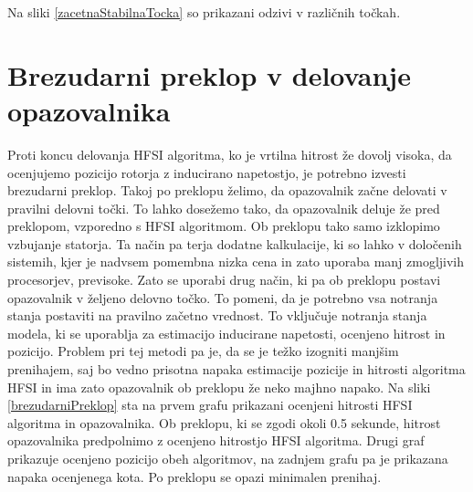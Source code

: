 \documentclass[a4paper,twoside,openright,12pt,slovene]{book}
\begin{document}
Na sliki \ref{zacetnaStabilnaTocka} so prikazani odzivi v različnih točkah.


\section{Brezudarni preklop v delovanje opazovalnika}

Proti koncu delovanja HFSI algoritma, ko je vrtilna hitrost že dovolj visoka, da ocenjujemo pozicijo rotorja z inducirano napetostjo, je potrebno izvesti brezudarni preklop. Takoj po preklopu želimo,
da opazovalnik začne delovati v pravilni delovni točki. To lahko dosežemo tako, da opazovalnik deluje že pred preklopom, vzporedno s HFSI algoritmom. Ob preklopu tako samo izklopimo vzbujanje
statorja. Ta način pa terja dodatne kalkulacije, ki so lahko v določenih sistemih, kjer je nadvsem pomembna nizka cena in zato uporaba manj zmogljivih procesorjev, previsoke. Zato se uporabi drug
način, ki pa ob preklopu postavi opazovalnik v željeno delovno točko. To pomeni, da je potrebno vsa notranja stanja postaviti na pravilno začetno vrednost. To vključuje notranja stanja modela, ki se
uporablja za estimacijo inducirane napetosti, ocenjeno hitrost in pozicijo. Problem pri tej metodi pa je, da se je težko izogniti manjšim prenihajem, saj bo vedno prisotna napaka estimacije
pozicije in hitrosti algoritma HFSI in ima zato opazovalnik ob preklopu že neko majhno napako. Na sliki \ref{brezudarniPreklop} sta na prvem grafu prikazani ocenjeni hitrosti HFSI algoritma in
opazovalnika. Ob preklopu, ki se zgodi okoli 0.5 sekunde, hitrost opazovalnika predpolnimo z ocenjeno hitrostjo HFSI algoritma. Drugi graf prikazuje ocenjeno pozicijo obeh algoritmov, na zadnjem grafu
pa je prikazana napaka ocenjenega kota. Po preklopu se opazi minimalen prenihaj.
\end{document}
